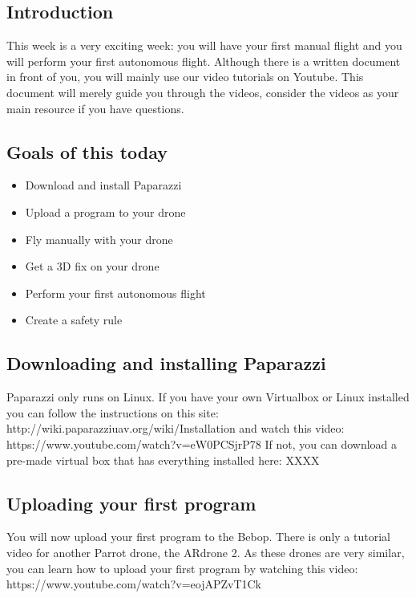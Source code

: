 \documentclass{article}
\begin{document}

\subsection*{Introduction}
This week is a very exciting week: you will have your first manual flight and you will perform your first autonomous flight. Although there is a written document in front of you, you will mainly use our video tutorials on Youtube. This document will merely guide you through the videos, consider the videos as your main resource if you have questions. 

\subsection*{Goals of this today}
\begin{itemize}
\item Download and install Paparazzi
\item Upload a program to your drone
\item Fly manually with your drone
\item Get a 3D fix on your drone
\item Perform your first autonomous flight
\item Create a safety rule
\end{itemize}

\subsection*{Downloading and installing Paparazzi}
Paparazzi only runs on Linux. If you have your own Virtualbox or Linux installed you can follow the instructions on this site: http://wiki.paparazziuav.org/wiki/Installation and watch this video: https://www.youtube.com/watch?v=eW0PCSjrP78
If not, you can download a pre-made virtual box that has everything installed here: XXXX

\subsection*{Uploading your first program}
You will now upload your first program to the Bebop. There is only a tutorial video for another Parrot drone, the ARdrone 2. As these drones are very similar, you can learn how to upload your first program by watching this video: https://www.youtube.com/watch?v=eojAPZvT1Ck
\end{document}
